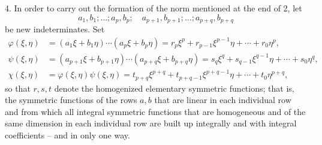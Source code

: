 4. In order to carry out the formation of the norm mentioned at the end of 2, let
\[
 a_1,b_1;\ldots; a_p,b_p;\quad a_{p+1},b_{p+1};\ldots; a_{p+q},b_{p+q}
\]
be new indeterminates. Set
\begin{equation}
\begin{aligned}
 \varphi(\xi,\eta)&=(a_1\xi+b_1\eta)\cdots(a_p\xi+b_p\eta)
     =r_p\xi^p+r_{p-1}\xi^{p-1}\eta+\cdots+r_0\eta^p,\\
 \psi(\xi,\eta)&=(a_{p+1}\xi+b_{p+1}\eta)\cdots(a_{p+q}\xi+b_{p+q}\eta)
     =s_q\xi^q+s_{q-1}\xi^{q-1}\eta+\cdots+s_0\eta^q,\\
 \chi(\xi,\eta)&=\varphi(\xi,\eta)\psi(\xi,\eta)
     =t_{p+q}\xi^{p+q}+t_{p+q-1}\xi^{p+q-1}\eta+\cdots+t_0\eta^{p+q},
\end{aligned}
\tag{8}
\end{equation}
so that $r,s,t$ denote the homogenized elementary symmetric functions; that is, the symmetric functions of the rows $a,b$ that are linear in each individual row and from which all integral symmetric functions that are homogeneous and of the same dimension in each individual row are built up integrally and with integral coefficients -- and in only one way.

